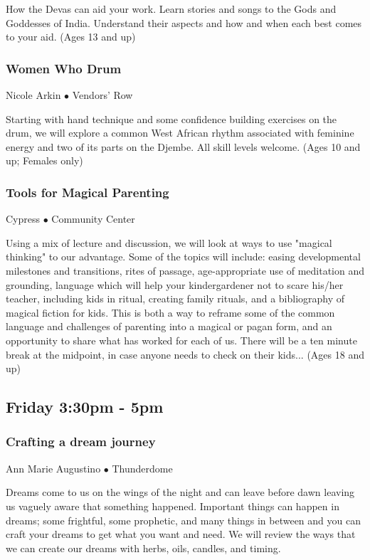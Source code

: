  How the Devas can aid your work. Learn stories and songs to the Gods and Goddesses of India. Understand their aspects and how and when each best comes to your aid. {\small (Ages 13 and up)}

\subsubsection{Women Who Drum}
\label{Fri-Arkin1}
{\small Nicole Arkin $\bullet$  Vendors' Row}

 Starting with hand technique and some confidence building exercises on the drum, we will explore a common West African rhythm associated with feminine energy and two of its parts on the Djembe. All skill levels welcome. {\small (Ages 10 and up; Females only)}

\subsubsection{Tools for Magical Parenting}
\label{Fri-Cypress2}
{\small Cypress $\bullet$  Community Center}

 Using a mix of lecture and discussion, we will look at ways to use "magical thinking" to our advantage. Some of the topics will include:  easing developmental milestones and transitions, rites of passage, age-appropriate use of meditation and grounding, language which will help your kindergardener not to scare his/her teacher, including kids in ritual, creating family rituals, and a bibliography of magical fiction for kids. This is both a way to reframe some of the common language and challenges of parenting into a magical or pagan form, and an opportunity to share what has worked for each of us. There will be a ten minute break at the midpoint, in case anyone needs to check on their kids... {\small (Ages 18 and up)}

\subsection{Friday 3:30pm - 5pm}

\subsubsection{Crafting a dream journey}
\label{Fri-AMA1}
{\small Ann Marie Augustino $\bullet$  Thunderdome}

 Dreams come to us on the wings of the night and can leave before dawn leaving us vaguely aware that something happened.  Important things can happen in dreams; some frightful, some prophetic, and many things in between and you can craft your dreams to get what you want and need.  We will review the ways that we can create our dreams with herbs, oils, candles, and timing.

